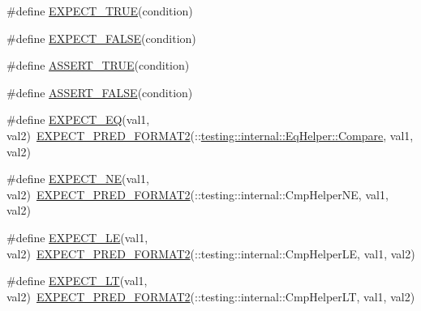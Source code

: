 \begin{DoxyCompactItemize}
\item 
\#define \mbox{\hyperlink{_obj__test_2lib_2googletest-master_2googletest_2include_2gtest_2gtest_8h_ac33e7cdfb5d44a7a0f0ab552eb5c3c6a}{E\+X\+P\+E\+C\+T\+\_\+\+T\+R\+UE}}(condition)
\item 
\#define \mbox{\hyperlink{_obj__test_2lib_2googletest-master_2googletest_2include_2gtest_2gtest_8h_aeb6c7ae89f440c90c1a1815951c836da}{E\+X\+P\+E\+C\+T\+\_\+\+F\+A\+L\+SE}}(condition)
\item 
\#define \mbox{\hyperlink{_obj__test_2lib_2googletest-master_2googletest_2include_2gtest_2gtest_8h_ae9244bfbda562e8b798789b001993fa5}{A\+S\+S\+E\+R\+T\+\_\+\+T\+R\+UE}}(condition)
\item 
\#define \mbox{\hyperlink{_obj__test_2lib_2googletest-master_2googletest_2include_2gtest_2gtest_8h_a8197fa52f3538588d20d8af4834c9003}{A\+S\+S\+E\+R\+T\+\_\+\+F\+A\+L\+SE}}(condition)
\item 
\#define \mbox{\hyperlink{_obj__test_2lib_2googletest-master_2googletest_2include_2gtest_2gtest_8h_a4159019abda84f5366acdb7604ff220a}{E\+X\+P\+E\+C\+T\+\_\+\+EQ}}(val1,  val2)~\mbox{\hyperlink{_obj__test_2lib_2googletest-release-1_88_81_2googletest_2include_2gtest_2gtest__pred__impl_8h_af0141918615a5e2d5247e9cda8324dae}{E\+X\+P\+E\+C\+T\+\_\+\+P\+R\+E\+D\+\_\+\+F\+O\+R\+M\+A\+T2}}(\+::\mbox{\hyperlink{classtesting_1_1internal_1_1_eq_helper_a14dd80457029c1ab4a4d04f20003d237}{testing\+::internal\+::\+Eq\+Helper\+::\+Compare}}, val1, val2)
\item 
\#define \mbox{\hyperlink{_obj__test_2lib_2googletest-master_2googletest_2include_2gtest_2gtest_8h_a6ae7443947f25abc58bfcfcfc56b0d75}{E\+X\+P\+E\+C\+T\+\_\+\+NE}}(val1,  val2)~\mbox{\hyperlink{_obj__test_2lib_2googletest-release-1_88_81_2googletest_2include_2gtest_2gtest__pred__impl_8h_af0141918615a5e2d5247e9cda8324dae}{E\+X\+P\+E\+C\+T\+\_\+\+P\+R\+E\+D\+\_\+\+F\+O\+R\+M\+A\+T2}}(\+::testing\+::internal\+::\+Cmp\+Helper\+NE, val1, val2)
\item 
\#define \mbox{\hyperlink{_obj__test_2lib_2googletest-master_2googletest_2include_2gtest_2gtest_8h_ae0f265632323b4a07b585dcfde10f60a}{E\+X\+P\+E\+C\+T\+\_\+\+LE}}(val1,  val2)~\mbox{\hyperlink{_obj__test_2lib_2googletest-release-1_88_81_2googletest_2include_2gtest_2gtest__pred__impl_8h_af0141918615a5e2d5247e9cda8324dae}{E\+X\+P\+E\+C\+T\+\_\+\+P\+R\+E\+D\+\_\+\+F\+O\+R\+M\+A\+T2}}(\+::testing\+::internal\+::\+Cmp\+Helper\+LE, val1, val2)
\item 
\#define \mbox{\hyperlink{_obj__test_2lib_2googletest-master_2googletest_2include_2gtest_2gtest_8h_af28c06b2b5e8dee151896f299f6610cf}{E\+X\+P\+E\+C\+T\+\_\+\+LT}}(val1,  val2)~\mbox{\hyperlink{_obj__test_2lib_2googletest-release-1_88_81_2googletest_2include_2gtest_2gtest__pred__impl_8h_af0141918615a5e2d5247e9cda8324dae}{E\+X\+P\+E\+C\+T\+\_\+\+P\+R\+E\+D\+\_\+\+F\+O\+R\+M\+A\+T2}}(\+::testing\+::internal\+::\+Cmp\+Helper\+LT, val1, val2)

\end{DoxyCompactItemize}
